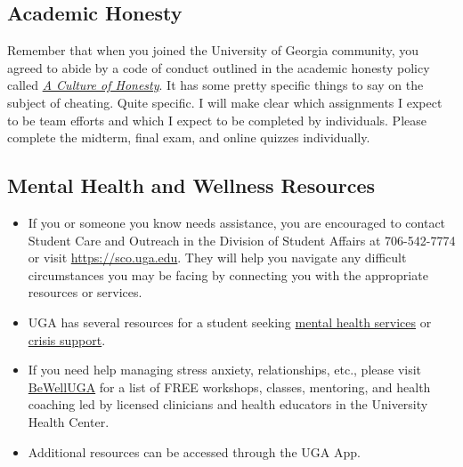 \documentclass[11pt, letterpaper]{article}
\begin{document}
\subsection*{Academic Honesty}
Remember that when you joined the University of Georgia community, you agreed to abide by a code of conduct outlined in the academic honesty policy called \href{https://honesty.uga.edu/Academic-Honesty-Policy/Introduction/}{\textit{A Culture of Honesty}}. It has some pretty specific things to say on the subject of cheating. Quite specific. I will make clear which assignments I expect to be team efforts and which I expect to be completed by individuals. Please complete the midterm, final exam, and online quizzes individually. 


\subsection*{Mental Health and Wellness Resources}

\begin{itemize}
	\item If you or someone you know needs assistance, you are encouraged to contact Student Care and Outreach in the Division of Student Affairs at 706-542-7774 or visit \href{https://sco.uga.edu}{https://sco.uga.edu}. They will help you navigate any difficult circumstances you may be facing by connecting you with the appropriate resources or services. 
	\item UGA has several resources for a student seeking \href{https://www.uhs.uga.edu/bewelluga/bewelluga}{mental health services} or \href{https://www.uhs.uga.edu/info/emergencies}{crisis support}. 
	\item If you need help managing stress anxiety, relationships, etc., please visit \href{https://www.uhs.uga.edu/bewelluga/bewelluga}{BeWellUGA} for a list of FREE workshops, classes, mentoring, and health coaching led by licensed clinicians and health educators in the University Health Center.
	\item Additional resources can be accessed through the UGA App.
\end{itemize}

\end{document}

